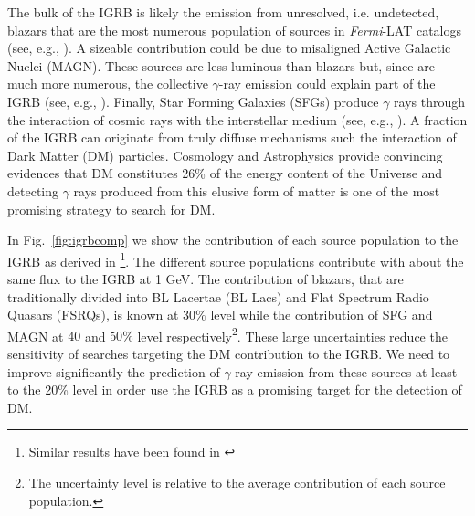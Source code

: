 \documentclass[12 pt]{article}
\newcommand{\FIXME}[1]{{\color{red}{\em Comment: }{#1}}}
\begin{document}
The bulk of the IGRB is likely the emission from unresolved, i.e. undetected, blazars that are the most numerous population of sources in {\it Fermi}-LAT catalogs (see, e.g., \cite{Ajello:2015mfa}).
A sizeable contribution could be due to misaligned Active Galactic Nuclei (MAGN). 
These sources are less luminous than blazars but, since are much more numerous, the collective $\gamma$-ray emission could explain part of the IGRB (see, e.g., \cite{DiMauro:2013xta}).
Finally, Star Forming Galaxies (SFGs) produce $\gamma$ rays through the interaction of cosmic rays with the interstellar medium (see, e.g., \cite{2012ApJ...755..164A}).
A fraction of the IGRB can originate from truly diffuse mechanisms such the interaction of Dark Matter (DM) particles. Cosmology and Astrophysics provide convincing evidences that DM constitutes 26\% of the energy content of the Universe and detecting $\gamma$ rays produced from this elusive form of matter is one of the most promising strategy to search for DM.  

In Fig.~\ref{fig:igrbcomp} we show the contribution of each source population to the IGRB  as derived in \cite{DiMauro:2015tfa}\footnote{Similar results have been found in \cite{Ajello:2015mfa}}.
The different source populations contribute with about the same flux to the IGRB at 1 GeV.
The contribution of blazars, that are traditionally divided into BL Lacertae (BL Lacs) and Flat Spectrum Radio Quasars (FSRQs), is known at $30\%$ level while the contribution of SFG and MAGN at $40$ and $50\%$ level respectively\footnote{The uncertainty level is relative to the average contribution of each source population.}.
These large uncertainties reduce the sensitivity of searches targeting the DM contribution to the IGRB. 
We need to improve significantly the prediction of $\gamma$-ray emission from these sources at least to the 20\% level in order use the IGRB as a promising target for the detection of DM.
\end{document}
